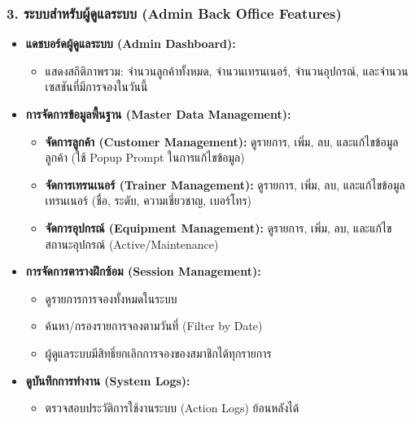 \subsubsection{3. ระบบสำหรับผู้ดูแลระบบ (Admin Back Office Features)}
\begin{itemize}
    \item \textbf{แดชบอร์ดผู้ดูแลระบบ (Admin Dashboard):}
    \begin{itemize}
        \item แสดงสถิติภาพรวม: จำนวนลูกค้าทั้งหมด, จำนวนเทรนเนอร์, จำนวนอุปกรณ์, และจำนวนเซสชันที่มีการจองในวันนี้
    \end{itemize}
    \item \textbf{การจัดการข้อมูลพื้นฐาน (Master Data Management):}
    \begin{itemize}
        \item \textbf{จัดการลูกค้า (Customer Management):} ดูรายการ, เพิ่ม, ลบ, และแก้ไขข้อมูลลูกค้า (ใช้ Popup Prompt ในการแก้ไขข้อมูล)
        \item \textbf{จัดการเทรนเนอร์ (Trainer Management):} ดูรายการ, เพิ่ม, ลบ, และแก้ไขข้อมูลเทรนเนอร์ (ชื่อ, ระดับ, ความเชี่ยวชาญ, เบอร์โทร)
        \item \textbf{จัดการอุปกรณ์ (Equipment Management):} ดูรายการ, เพิ่ม, ลบ, และแก้ไขสถานะอุปกรณ์ (Active/Maintenance)
    \end{itemize}
    \item \textbf{การจัดการตารางฝึกซ้อม (Session Management):}
    \begin{itemize}
        \item ดูรายการการจองทั้งหมดในระบบ
        \item ค้นหา/กรองรายการจองตามวันที่ (Filter by Date)
        \item ผู้ดูแลระบบมีสิทธิ์ยกเลิกการจองของสมาชิกได้ทุกรายการ
    \end{itemize}
    \item \textbf{ดูบันทึกการทำงาน (System Logs):}
    \begin{itemize}
        \item ตรวจสอบประวัติการใช้งานระบบ (Action Logs) ย้อนหลังได้
    \end{itemize}
\end{itemize}

